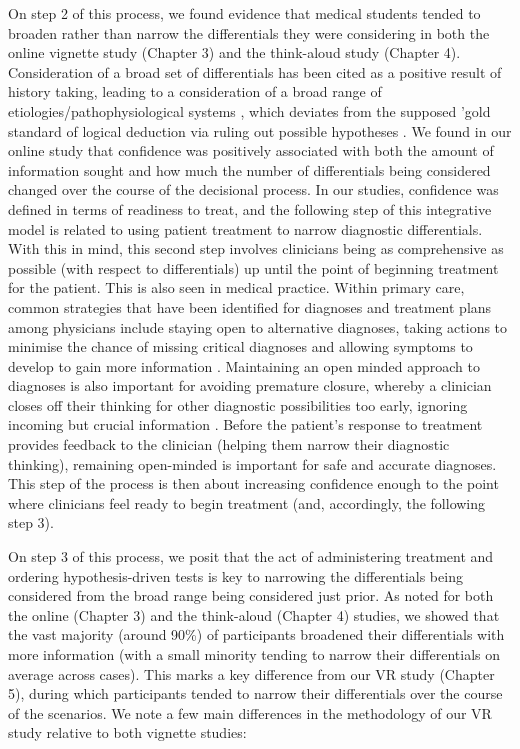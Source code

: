 \documentclass[a4paper, nobind]{templates/ociamthesis}
\begin{document}
On step 2 of this process, we found evidence that medical students tended to broaden rather than narrow the differentials they were considering in both the online vignette study (Chapter 3) and the think-aloud study (Chapter 4). Consideration of a broad set of differentials has been cited as a positive result of history taking, leading to a consideration of a broad range of etiologies/pathophysiological systems \autocite{devries_improving_nodate}, which deviates from the supposed 'gold standard of logical deduction via ruling out possible hypotheses \autocite{kassirer_teaching_1983}. We found in our online study that confidence was positively associated with both the amount of information sought and how much the number of differentials being considered changed over the course of the decisional process. In our studies, confidence was defined in terms of readiness to treat, and the following step of this integrative model is related to using patient treatment to narrow diagnostic differentials. With this in mind, this second step involves clinicians being as comprehensive as possible (with respect to differentials) up until the point of beginning treatment for the patient. This is also seen in medical practice. Within primary care, common strategies that have been identified for diagnoses and treatment plans among physicians include staying open to alternative diagnoses, taking actions to minimise the chance of missing critical diagnoses and allowing symptoms to develop to gain more information \autocite{hewson_strategies_1996}. Maintaining an open minded approach to diagnoses is also important for avoiding premature closure, whereby a clinician closes off their thinking for other diagnostic possibilities too early, ignoring incoming but crucial information \autocite{eva_difficulty_2006}. Before the patient's response to treatment provides feedback to the clinician (helping them narrow their diagnostic thinking), remaining open-minded is important for safe and accurate diagnoses. This step of the process is then about increasing confidence enough to the point where clinicians feel ready to begin treatment (and, accordingly, the following step 3).

On step 3 of this process, we posit that the act of administering treatment and ordering hypothesis-driven tests is key to narrowing the differentials being considered from the broad range being considered just prior. As noted for both the online (Chapter 3) and the think-aloud (Chapter 4) studies, we showed that the vast majority (around 90\%) of participants broadened their differentials with more information (with a small minority tending to narrow their differentials on average across cases). This marks a key difference from our VR study (Chapter 5), during which participants tended to narrow their differentials over the course of the scenarios. We note a few main differences in the methodology of our VR study relative to both vignette studies:
\end{document}
